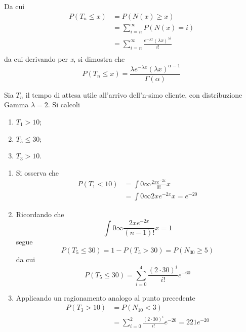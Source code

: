 \documentclass{subfiles}
\begin{document}
Da cui
\[\begin{aligned}
        P(T_{n} \le x) & = P(N(x) \ge x)                                                                   \\
                       & = \sum\limits_{i = n}^{\infty}{P(N(x) = i)}                                       \\
                       & = \sum\limits_{i = n}^{\infty}{\frac{e^{-\lambda x} (\lambda x)^{\lambda i}}{i!}} \\
    \end{aligned}\]
da cui derivando per \emph{x}, si dimostra che
\[
    P(T_{n} \le x) = \frac{\lambda e^{-\lambda x} (\lambda x)^{\alpha - 1}}{\Gamma(\alpha)}
\]
\clearpage
\begin{Example*}
    Sia \(T_{n}\) il tempo di attesa utile all'arrivo dell'n-simo cliente, con distribuzione Gamma \(\lambda = 2\).
    Si calcoli
    \begin{enumerate}
        \item \(T_{1} > 10\);
        \item \(T_{5} \le 30\);
        \item \(T_{3} > 10\).
    \end{enumerate}

    \begin{enumerate}
        \item Si osserva che
              \[\begin{aligned}
                      P(T_{1} < 10) & = \int{0}{\infty}{\frac{2x e^{-2x}}{0!}}{x} \\
                                    & = \int{0}{\infty}{2x e^{-2x}}{x} = e^{-20}
                  \end{aligned}\]

        \item Ricordando che
              \[
                  \int{0}{\infty}{\frac{2x e^{-2x}}{(n - 1)!}}{x} = 1
              \]
              segue
              \[
                  P(T_{5} \le 30) = 1 - P(T_{5} > 30) = P(N_{30} \ge 5)
              \]
              da cui
              \[
                  P(T_{5} \le 30) = \sum\limits_{i = 0}^{4} \frac{(2 \cdot 30)^{i}}{i!}e^{-60}
              \]

        \item Applicando un ragionamento analogo al punto precedente
              \[\begin{aligned}
                      P(T_{3} > 10) & = P(N_{10} < 3)                                                             \\
                                    & = \sum\limits_{i = 0}^{2}{\frac{(2 \cdot 30)^{i}}{i!} e^{-20}} = 221e^{-20}
                  \end{aligned}\]
    \end{enumerate}
\end{Example*}
\end{document}
